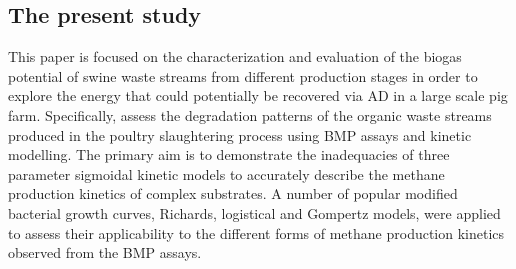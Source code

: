 \subsection{The present study}
This paper is focused on the characterization and evaluation of the biogas potential of swine waste streams from different production stages in order to explore the energy that could potentially be recovered via AD in a large scale pig farm. Specifically, assess the degradation patterns of the organic waste streams produced in the poultry slaughtering process using BMP assays and kinetic modelling. The primary aim is to demonstrate the inadequacies of three parameter sigmoidal kinetic models to accurately describe the methane production kinetics of complex substrates. A number of popular modified bacterial growth curves, Richards, logistical and Gompertz models, were applied to assess their applicability to the different forms of methane production kinetics observed from the BMP assays.